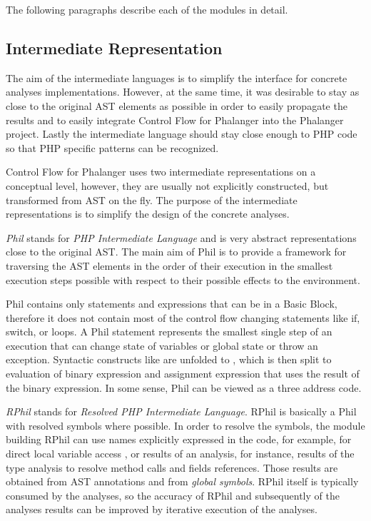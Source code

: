     The following paragraphs describe each of the 
    modules in detail.

    \subsection{Intermediate Representation}
    The aim of the intermediate languages is to simplify the 
    interface for concrete analyses implementations. 
    However, at the same time, it was desirable to stay as 
    close to the original AST elements as possible in order 
    to easily propagate the results and to easily integrate 
    Control Flow for Phalanger into the Phalanger project.         
    Lastly the intermediate language should stay close enough 
    to PHP code so that PHP specific patterns can be recognized.    
    
    Control Flow for Phalanger uses two intermediate representations 
    on a conceptual level, however, they are usually not explicitly 
    constructed, but transformed from AST on the fly. The purpose 
    of the intermediate representations is to simplify the design 
    of the concrete analyses.
    
    \emph{Phil} stands for \emph{PHP Intermediate Language} and is 
    very abstract representations close to the original AST. 
    The main aim of Phil is to provide a framework for 
    traversing the AST elements in the order of their 
    execution in the smallest execution steps possible 
    with respect to their possible effects to the environment.     
    
    Phil contains only statements and expressions that can be 
    in a Basic Block, therefore it does not contain most of the 
    control flow changing statements like if, switch, or loops. 
    A Phil statement represents the smallest single step 
    of an execution that can change state of variables 
    or global state or throw an exception. Syntactic 
    constructs like  are unfolded to 
    , which is then split to 
    evaluation of binary expression and assignment expression 
    that uses the result of the binary expression. In some sense, 
    Phil can be viewed as a three address code.
    
    \emph{RPhil} stands for \emph{Resolved PHP Intermediate Language}. 
    RPhil is basically a Phil with resolved symbols where possible. 
    In order to resolve the symbols, the module building RPhil 
    can use names explicitly expressed in the code, for example, 
    for direct local variable access , or results of 
    an analysis, for instance, results of the type analysis to 
    resolve method calls and fields references. Those results 
    are obtained from AST annotations and from \emph{global symbols}.
    RPhil itself is typically consumed by the analyses, 
    so the accuracy of RPhil and subsequently of the 
    analyses results can be improved by iterative execution 
    of the analyses.
    
